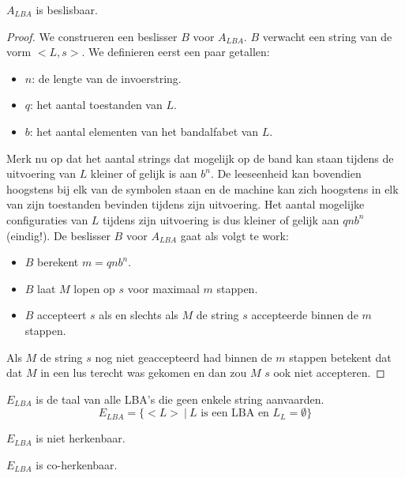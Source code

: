 \documentclass[main.tex]{subfiles}
\begin{document}
\begin{st}
  \label{st:a-lba-is-besl}
  $A_{LBA}$ is beslisbaar.

  \begin{proof}
    We construeren een beslisser $B$ voor $A_{LBA}$.
    $B$ verwacht een string van de vorm $<L,s>$.
    We definieren eerst een paar getallen:
    \begin{itemize}
    \item $n$: de lengte van de invoerstring.
    \item $q$: het aantal toestanden van $L$.
    \item $b$: het aantal elementen van het bandalfabet van $L$.
    \end{itemize}
    Merk nu op dat het aantal strings dat mogelijk op de band kan staan tijdens de uitvoering van $L$ kleiner of gelijk is aan $b^{n}$.
    De leeseenheid kan bovendien hoogstens bij elk van de symbolen staan en de machine kan zich hoogstens in elk van zijn toestanden bevinden tijdens zijn uitvoering.
    Het aantal mogelijke configuraties van $L$ tijdens zijn uitvoering is dus kleiner of gelijk aan $qnb^{n}$ (eindig!).
    De beslisser $B$ voor $A_{LBA}$ gaat als volgt te work:
    \begin{itemize}
    \item $B$ berekent $m = qnb^{n}$.
    \item $B$ laat $M$ lopen op $s$ voor maximaal $m$ stappen.
    \item $B$ accepteert $s$ als en slechts als $M$ de string $s$ accepteerde binnen de $m$ stappen.
    \end{itemize}
    Als $M$ de string $s$ nog niet geaccepteerd had binnen de $m$ stappen betekent dat dat $M$ in een lus terecht was gekomen en dan zou $M$ $s$ ook niet accepteren.
  \end{proof}
\end{st}

\begin{de}
  \label{de:e-lba}
  $E_{LBA}$ is de taal van alle LBA's die geen enkele string aanvaarden.
  \[ E_{LBA} = \{ <L> \ |\ L \text{ is een LBA en } L_{L} = \emptyset \} \]
\end{de}

\begin{st}
  \label{st:e-lba-niet-herk}
  $E_{LBA}$ is niet herkenbaar.
\end{st}

\begin{st}
  \label{st:e-lba-coherk}
  $E_{LBA}$ is co-herkenbaar.
\end{st}
\end{document}
